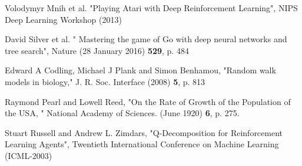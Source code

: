 \documentclass[a4paper,prd,twocolumn,nofootinbib,superscriptaddress,floatfix]{revtex4}
\begin{document}
\begin{thebibliography}{99}
    \scriptsize

 
Volodymyr Mnih et al. 
"Playing Atari with Deep Reinforcement Learning",
 NIPS Deep Learning Workshop (2013)

 David Silver et al. 
" Mastering the game of Go with deep neural networks and tree search",
Nature (28 January 2016) {\bf {529}}, p. 484

  Edward A Codling, Michael J Plank and Simon Benhamou,
  "Random walk models in biology,"
  J. R. Soc. Interface (2008) {\bf 5}, p. 813

   Raymond Pearl and Lowell Reed, 
   "On the Rate of Growth of the Population of the USA, " 
  National Academy of Sciences. (June 1920) {\bf 6}, p. 275.
   
 Stuart Russell and Andrew L. Zimdars,
 "Q-Decomposition for Reinforcement Learning Agents",
  Twentieth International Conference on Machine Learning (ICML-2003)
 

\end{thebibliography}
\end{document}
